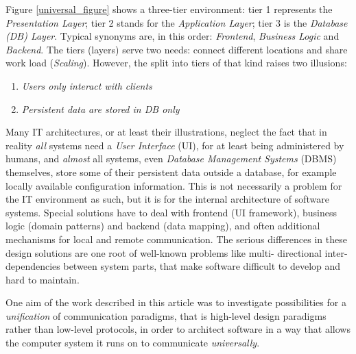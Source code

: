 Figure \ref{universal_figure} shows a three-tier environment: tier 1 represents
the \emph{Presentation Layer}; tier 2 stands for the \emph{Application Layer};
tier 3 is the \emph{Database (DB) Layer}. Typical synonyms are, in this order:
\emph{Frontend}, \emph{Business Logic} and \emph{Backend}. The tiers (layers)
serve two needs: connect different locations and share work load (\emph{Scaling}).
However, the split into tiers of that kind raises two illusions:

\begin{enumerate}
    \item \emph{Users only interact with clients}
    \item \emph{Persistent data are stored in DB only}
\end{enumerate}

Many IT architectures, or at least their illustrations, neglect the fact that
in reality \emph{all} systems need a \emph{User Interface} (UI), for at least
being administered by humans, and \emph{almost} all systems, even
\emph{Database Management Systems} (DBMS) themselves, store some of their
persistent data outside a database, for example locally available configuration
information. This is not necessarily a problem for the IT environment as such,
but it is for the internal architecture of software systems. Special solutions
have to deal with frontend (UI framework), business logic (domain patterns) and
backend (data mapping), and often additional mechanisms for local and remote
communication. The serious differences in these design solutions are one root
of well-known problems like multi- directional inter-dependencies between system
parts, that make software difficult to develop and hard to maintain.

One aim of the work described in this article was to investigate possibilities
for a \emph{unification} of communication paradigms, that is high-level design
paradigms rather than low-level protocols, in order to architect software in a
way that allows the computer system it runs on to communicate \emph{universally}.
